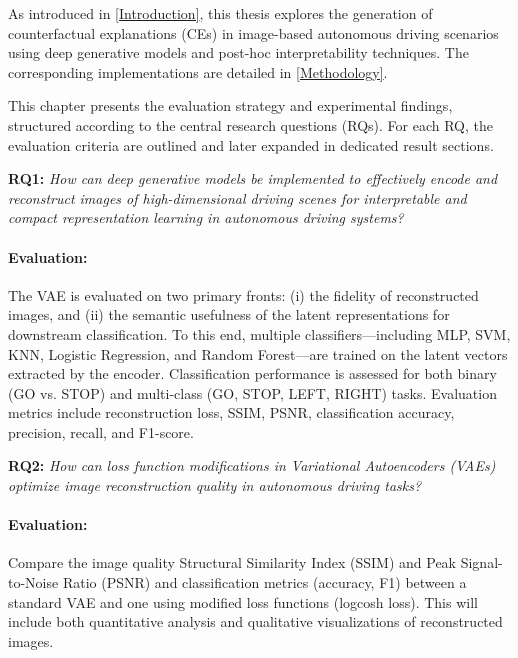 As introduced in \cref{Introduction}, this thesis explores the generation of counterfactual explanations (CEs) in image-based autonomous driving scenarios using deep generative models and post-hoc interpretability techniques. The corresponding implementations are detailed in \cref{Methodology}.

This chapter presents the evaluation strategy and experimental findings, structured according to the central research questions (RQs). For each RQ, the evaluation criteria are outlined and later expanded in dedicated result sections.

\textbf{RQ1:} \textit{How can deep generative models be implemented to effectively encode and reconstruct images of high-dimensional driving scenes for interpretable and compact representation learning in autonomous driving systems?}

\vspace{-1em}

\paragraph{Evaluation:}The VAE is evaluated on two primary fronts: (i) the fidelity of reconstructed images, and (ii) the semantic usefulness of the latent representations for downstream classification. To this end, multiple classifiers—including MLP, SVM, KNN, Logistic Regression, and Random Forest—are trained on the latent vectors extracted by the encoder. Classification performance is assessed for both binary (GO vs. STOP) and multi-class (GO, STOP, LEFT, RIGHT) tasks. Evaluation metrics include reconstruction loss, SSIM, PSNR, classification accuracy, precision, recall, and F1-score.
    
\vspace{1em}

\textbf{RQ2:} \textit{How can loss function modifications in Variational Autoencoders (VAEs) optimize image reconstruction quality in autonomous driving tasks?} 

\vspace{-1em}

\paragraph{Evaluation:}Compare the image quality Structural Similarity Index (SSIM) and Peak Signal-to-Noise Ratio (PSNR) and classification metrics (accuracy, F1) between a standard VAE and one using modified loss functions (logcosh loss). This will include both quantitative analysis and qualitative visualizations of reconstructed images.

